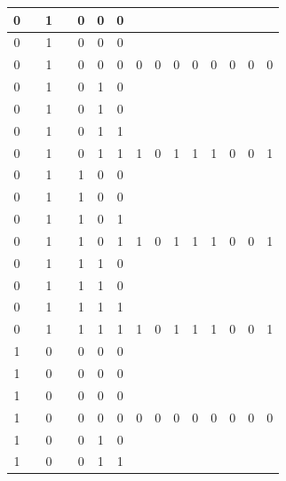 \begin{table}[!tb]
\begin{tabular}{|c|c|c|c|c|c|c|c|c|c|c|c|c|c|c|}
        \rowcolor{yellow!40} 0 &  & 1 &  & 0 & 0 & 0 &  &  &  &  &  &  &  &  \\ \hline
        \rowcolor{yellow!40} 0 &  & 1 &  & 0 & 0 & 0 &  &  &  &  &  &  &  &  \\ \hline
        \rowcolor{yellow!40} 0 &  & 1 &  & 0 & 0 & 0 & 0 & 0 & 0 & 0 & 0 & 0 & 0 & 0 \\ \hline
        \rowcolor{gray!40} 0 &  & 1 &  & 0 & 1 & 0 &  &  &  &  &  &  &  &  \\ \hline
        \rowcolor{gray!40} 0 &  & 1 &  & 0 & 1 & 0 &  &  &  &  &  &  &  &  \\ \hline
        \rowcolor{gray!40} 0 &  & 1 &  & 0 & 1 & 1 &  &  &  &  &  &  &  &  \\ \hline
        \rowcolor{gray!40} 0 &  & 1 &  & 0 & 1 & 1 & 1 & 0 & 1 & 1 & 1 & 0 & 0 & 1 \\ \hline
        \rowcolor{blue!40} 0 &  & 1 &  & 1 & 0 & 0 &  &  &  &  &  &  &  &  \\ \hline
        \rowcolor{blue!40} 0 &  & 1 &  & 1 & 0 & 0 &  &  &  &  &  &  &  &  \\ \hline
        \rowcolor{blue!40} 0 &  & 1 &  & 1 & 0 & 1 &  &  &  &  &  &  &  &  \\ \hline
        \rowcolor{blue!40} 0 &  & 1 &  & 1 & 0 & 1 & 1 & 0 & 1 & 1 & 1 & 0 & 0 & 1 \\ \hline
        \rowcolor{red!40} 0 &  & 1 &  & 1 & 1 & 0 &  &  &  &  &  &  &  &  \\ \hline
        \rowcolor{red!40} 0 &  & 1 &  & 1 & 1 & 0 &  &  &  &  &  &  &  &  \\ \hline
        \rowcolor{red!40} 0 &  & 1 &  & 1 & 1 & 1 &  &  &  &  &  &  &  &  \\ \hline
        \rowcolor{red!40} 0 &  & 1 &  & 1 & 1 & 1 & 1 & 0 & 1 & 1 & 1 & 0 & 0 & 1 \\ \hline
        \rowcolor{green!40} 1 &  & 0 &  & 0 & 0 & 0 &  &  &  &  &  &  &  &  \\ \hline
        \rowcolor{green!40} 1 &  & 0 &  & 0 & 0 & 0 &  &  &  &  &  &  &  &  \\ \hline
        \rowcolor{green!40} 1 &  & 0 &  & 0 & 0 & 0 &  &  &  &  &  &  &  &  \\ \hline
        \rowcolor{green!40} 1 &  & 0 &  & 0 & 0 & 0 & 0 & 0 & 0 & 0 & 0 & 0 & 0 & 0 \\ \hline
        \rowcolor{yellow!40} 1 &  & 0 &  & 0 & 1 & 0 &  &  &  &  &  &  &  &  \\ \hline
        \rowcolor{yellow!40} 1 &  & 0 &  & 0 & 1 & 1 &  &  &  &  &  &  &  &  \\ \hline

\end{tabular}
\end{table}
